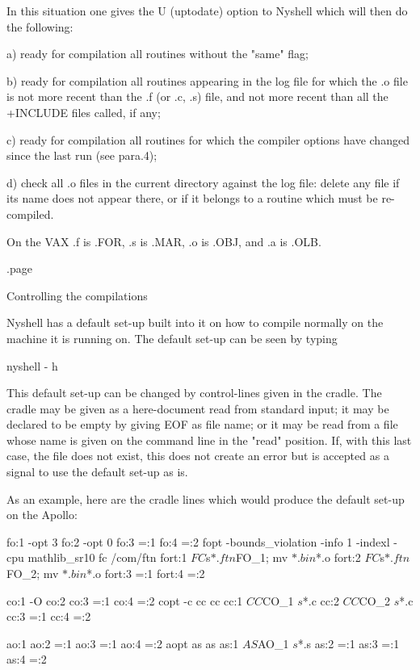 In this situation one gives the U (uptodate) option to Nyshell which will
then do the following:

      a) ready for compilation all routines without the "same" flag;

      b) ready for compilation all routines appearing in the log file for
         which the .o file is not more recent than the .f (or .c, .s) file,
         and not more recent than all the +INCLUDE files called, if any;

      c) ready for compilation all routines for which the compiler options
         have changed since the last run (see para.4);

      d) check all .o files in the current directory against the log file:
         delete any file if its name does not appear there, or if it belongs
         to a routine which must be re-compiled.

On the VAX  .f is .FOR, .s is .MAR, .o is .OBJ, and .a is .OLB.

.page
\item
Controlling the compilations

Nyshell has a default set-up built into it on how to compile normally on the
machine it is running on. The default set-up can be seen by typing

      nyshell - h

This default set-up can be changed by control-lines given in the cradle.
The cradle may be given as a here-document read from standard input;
it may be declared to be empty by giving EOF as file name; or it may be
read from a file whose name is given on the command line in the "read"
position. If, with this last case, the file does not exist, this does
not create an error but is accepted as a signal to use the default
set-up as is.

As an example, here are the cradle lines which would produce the
default set-up on the Apollo:

   fo:1     -opt 3
   fo:2     -opt 0
   fo:3     =:1
   fo:4     =:2
   fopt     -bounds_violation -info 1 -indexl -cpu mathlib_sr10
   fc       /com/ftn
   fort:1   ${FC} ${s}$*.ftn ${FO_1}; mv $*.bin $*.o
   fort:2   ${FC} ${s}$*.ftn ${FO_2}; mv $*.bin $*.o
   fort:3   =:1
   fort:4   =:2

   co:1     -O
   co:2
   co:3     =:1
   co:4     =:2
   copt     -c
   cc       cc
   cc:1     ${CC} ${CO_1} ${s}$*.c
   cc:2     ${CC} ${CO_2} ${s}$*.c
   cc:3     =:1
   cc:4     =:2

   ao:1
   ao:2     =:1
   ao:3     =:1
   ao:4     =:2
   aopt
   as       as
   as:1     ${AS} ${AO_1} ${s}$*.s
   as:2     =:1
   as:3     =:1
   as:4     =:2

